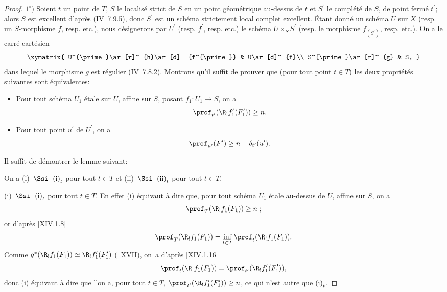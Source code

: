 \begin{proof}
$1^\circ)$ Soient $t$ un point de $T$, $\overline{S}$ le localis\'e strict de $S$ en un point g\'eom\'etrique au-dessus de $t$ et $S^{\prime}$ le compl\'et\'e de $\overline{S}$, de point ferm\'e $t^{\prime}$; alors $\overline{S}$ est excellent d'apr\`es (\EGA IV~7.9.5), donc $S^{\prime}$ est un sch\'ema strictement local complet excellent. \'Etant donn\'e un sch\'ema $U$ sur $X$ (resp. un $S$-morphisme $f$, resp. etc.), nous d\'esignerons par $U^{\prime}$ (resp. $f^{\prime}$, resp. etc.) le sch\'ema $U\times_{S}S^{\prime}$ (resp. le morphisme $f_{(S^{\prime})}$, resp. etc.). On a le carr\'e cart\'esien
$$
\xymatrix{ U^{\prime}\ar[r]^-{h}\ar[d]_-{f^{\prime}} & U\ar[d]^-{f}\\
S^{\prime}\ar[r]^-{g} & S, }
$$
dans lequel le morphisme $g$ est r\'egulier (\EGA IV~7.8.2). Montrons qu'il suffit de prouver que (pour tout point $t\in T$) les deux propri\'et\'es suivantes sont \'equivalentes:
\begin{itemize}
\item[$\textup{(i)}_{t}$] Pour tout sch\'ema $U_{1}$ \'etale sur $U$, affine sur $S$, posant $f_{1}\colon U_{1}\to S$, on a
$$
\prof_{t^{\prime}}(\R_{!}f_{1}^{\prime}(F_{1}^{\prime}))\geq n.
$$

\item[$\textup{(ii)}_{t}$] Pour tout point $u^{\prime}$ de $U^{\prime}$, on a
$$
\prof_{u^{\prime}}(F^{\prime})\geq n-\delta_{t^{\prime}}(u^{\prime}).
$$
\end{itemize}
Il suffit de d\'emontrer le lemme suivant:

\begin{sublemme} \label{XIV.4.2.1}
On a \textup{(i)}~$\Ssi$~$\textup{(i)}_{t}$ pour tout $t\in T$ et \textup{(ii)}~$\Ssi$~$\textup{(ii)}_{t}$ pour tout $t\in T$.
\end{sublemme}

\textup{(i)}~$\Ssi$~$\textup{(i)}_{t}$ pour tout $t\in T$. En effet \textup{(i)} \'equivaut \`a dire que, pour tout sch\'ema $U_{1}$ \'etale au-dessus de $U$, affine sur $S$, on a
$$
\prof_{T}(\R_{!}f_{1}(F_{1}))\geq n\;;$$
or d'apr\`es \ref{XIV.1.8}
$$
\prof_{T}(\R_{!}f_{1}(F_{1}))=\inf_{t\in T}\prof_{t}(\R_{!}f_{1}(F_{1})).
$$
Comme $g^{\ast}(\R_{!}f_{1}(F_{1}))\simeq\R_{!}f_{1}^{\prime}(F_{1}^{\prime})$ (~XVII), on~a d'apr\`es \ref{XIV.1.16}
$$
\prof_{t}(\R_{!}f_{1}(F_{1}))=\prof_{t^{\prime}}(\R_{!}f_{1}^{\prime}(F_{1}^{\prime})),
$$
donc \textup{(i)} \'equivaut \`a dire que l'on a, pour tout $t\in T$, $\prof_{t^{\prime}}(\R_{!}f_{1}^{\prime}(F_{1}^{\prime}))\geq n$, ce qui n'est autre que $\textup{(i)}_{t}$.


\end{proof}
